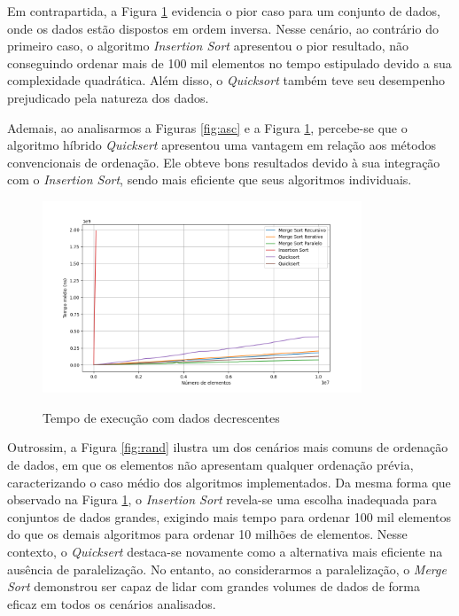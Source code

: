 \documentclass[12pt]{article}
\begin{document}
Em contrapartida, a Figura \ref{fig:desc} evidencia o pior caso para um conjunto de dados, onde os dados estão dispostos em ordem inversa. Nesse cenário, ao contrário do primeiro caso, o algoritmo \textit{Insertion Sort} apresentou o pior resultado, não conseguindo ordenar mais de 100 mil elementos no tempo estipulado devido a sua complexidade quadrática. Além disso, o \textit{Quicksort} também teve seu desempenho prejudicado pela natureza dos dados.

Ademais, ao analisarmos a Figuras \ref{fig:asc} e a Figura \ref{fig:desc}, percebe-se que o algoritmo híbrido \textit{Quicksert} apresentou uma vantagem em relação aos métodos convencionais de ordenação. Ele obteve bons resultados devido à sua integração com o \textit{Insertion Sort}, sendo mais eficiente que seus algoritmos individuais.

\begin{figure}[ht]
\centering
\caption{Tempo de execução com dados decrescentes}
\includegraphics[width=0.85\textwidth]{time_descending.png}
\label{fig:desc}
\end{figure}


Outrossim, a Figura \ref{fig:rand} ilustra um dos cenários mais comuns de ordenação de dados, em que os elementos não apresentam qualquer ordenação prévia, caracterizando o caso médio dos algoritmos implementados. Da mesma forma que observado na Figura \ref{fig:desc}, o \textit{Insertion Sort} revela-se uma escolha inadequada para conjuntos de dados grandes, exigindo mais tempo para ordenar 100 mil elementos do que os demais algoritmos para ordenar 10 milhões de elementos. Nesse contexto, o \textit{Quicksert} destaca-se novamente como a alternativa mais eficiente na ausência de paralelização. No entanto, ao considerarmos a paralelização, o \textit{Merge Sort} demonstrou ser capaz de lidar com grandes volumes de dados de forma eficaz em todos os cenários analisados.
\end{document}
